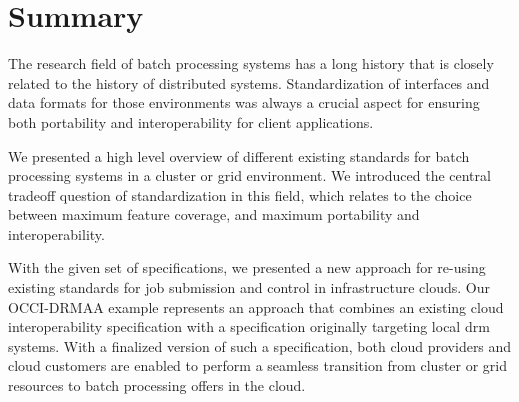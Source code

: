 \documentclass[twocolumn]{svjour3}       %
\begin{document}
\section{Summary}

The research field of batch processing systems has a long history that is closely related to the history of distributed systems. Standardization of interfaces and data formats for those environments was always a crucial aspect for ensuring both portability and interoperability for client applications.

We presented a high level overview of different existing standards for batch processing systems in a cluster or grid environment. We introduced the central tradeoff question of standardization in this field, which relates to the choice between maximum feature coverage, and maximum portability and interoperability. 

With the given set of specifications, we presented a new approach for re-using existing standards for job submission and control in infrastructure clouds. Our OCCI-DRMAA example represents an approach that combines an existing cloud interoperability specification with a specification originally targeting local \gls{drm} systems. With a finalized version of such a specification, both cloud providers and cloud customers are enabled to perform a seamless transition from cluster or grid resources to batch processing offers in the cloud. 

\printglossaries


\end{document}
